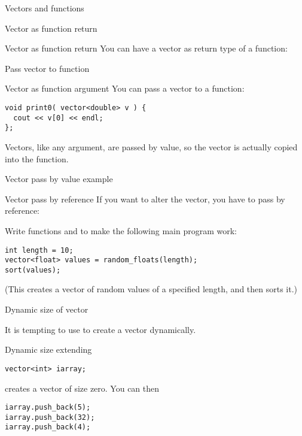 {Vectors and functions}

 {Vector as function return}

\begin{block}{Vector as function return}
  \label{sl:vector-return}
  You can have a vector as return type of a function:
\end{block}

 {Pass vector to function}

\begin{block}{Vector as function argument}
  \label{sl:vector-arg}
  You can pass a vector to a function:
\begin{verbatim}
void print0( vector<double> v ) {
  cout << v[0] << endl;
};
\end{verbatim}
Vectors, like any argument, are passed by value, so the vector is
actually copied into the function.
\end{block}

\begin{block}{Vector pass by value example}
  \label{sl:vector-arg-ex}
\end{block}

\begin{block}{Vector pass by reference}
  \label{sl:vector-arg-ref}
  If you want to alter the vector, you have to pass by reference:
\end{block}

\begin{exercise}
  \label{ex:vec-rand-sort}
  Write functions  and  to make the following
  main program work:
\begin{verbatim}
int length = 10;
vector<float> values = random_floats(length);
sort(values);
\end{verbatim}
  (This creates a vector of random values of a specified length, and
then sorts it.)
\end{exercise}

 {Dynamic size of vector}

It is tempting to use  to create a vector dynamically.

\begin{block}{Dynamic size extending}
  \label{sl:vector-extend}
\begin{verbatim}
vector<int> iarray;
\end{verbatim}
creates a vector of size zero. You can then
\begin{verbatim}
iarray.push_back(5);
iarray.push_back(32);
iarray.push_back(4);
\end{verbatim}
\end{block}

